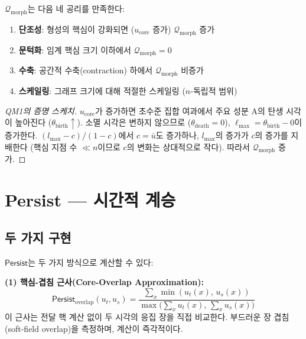 $\mathcal{Q}_{\mathrm{morph}}$는 다음 네 공리를 만족한다:

\begin{theorem}[형태학적 품질 공리]
\label{thm:qm-axioms}
\begin{enumerate}
    \item[\textbf{QM1}] \textbf{단조성}: 형성의 핵심이 강화되면 ($u_{\mathrm{core}}$ 증가) $\mathcal{Q}_{\mathrm{morph}}$ 증가
    \item[\textbf{QM2}] \textbf{문턱화}: 임계 핵심 크기 이하에서 $\mathcal{Q}_{\mathrm{morph}} = 0$
    \item[\textbf{QM3}] \textbf{수축}: 공간적 수축(contraction) 하에서 $\mathcal{Q}_{\mathrm{morph}}$ 비증가
    \item[\textbf{QM4}] \textbf{스케일링}: 그래프 크기에 대해 적절한 스케일링 ($n$-독립적 범위)
\end{enumerate}
\end{theorem}

\begin{proof}[QM1의 증명 스케치]
$u_{\mathrm{core}}$가 증가하면 초수준 집합 여과에서 주요 성분 A의 탄생 시각이 높아진다 ($\theta_{\mathrm{birth}} \uparrow$). 소멸 시각은 변하지 않으므로 ($\theta_{\mathrm{death}} = 0$), $\ell_{\max} = \theta_{\mathrm{birth}} - 0$이 증가한다. $(l_{\max} - c)/(1-c)$에서 $c = \bar{u}$도 증가하나, $l_{\max}$의 증가가 $c$의 증가를 지배한다 (핵심 지점 수 $\ll n$이므로 $c$의 변화는 상대적으로 작다). 따라서 $\mathcal{Q}_{\mathrm{morph}}$ 증가.
\end{proof}


\section{Persist --- 시간적 계승}
\label{sec:persist}

\subsection{두 가지 구현}

$\mathsf{Persist}$는 두 가지 방식으로 계산할 수 있다:

\textbf{(1) 핵심-겹침 근사(Core-Overlap Approximation):}
\begin{equation}
    \mathsf{Persist}_{\mathrm{overlap}}(u_t, u_s) = \frac{\sum_{x} \min(u_t(x),\, u_s(x))}{\max\!\big(\sum_x u_t(x),\, \sum_x u_s(x)\big)}
    \label{eq:persist-overlap}
\end{equation}
이 근사는 전달 핵 계산 없이 두 시각의 응집 장을 직접 비교한다. 부드러운 장 겹침(soft-field overlap)을 측정하며, 계산이 즉각적이다.

